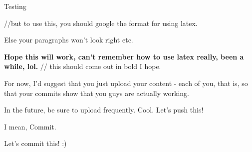 Testing


//but to use this, you should google the format for using latex.

Else your paragraphs won't look right etc.

\textbf {Hope this will work, can't remember how to use latex really, been a while, lol.} // this should come out in bold I hope.


For now, I'd suggest that you just upload your content - each of you, that is, so that your commits show that you guys are actually working.

In the future, be sure to upload frequently.
Cool.
Let's push this!

I mean, Commit.

Let's commit this! :)
